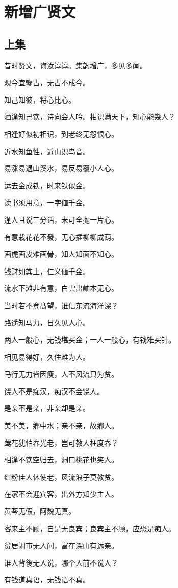 \documentclass[12pt,oneside]{book}
\begin{document}
\chapter{新增广贤文}
\section{上集}
昔时贤文，诲汝谆谆。集韵增广，多见多闻。

观今宜鑒古，无古不成今。

知己知彼，将心比心。

酒逢知己饮，诗向会人吟。相识满天下，知心能幾人？

相逢好似初相识，到老终无怨恨心。

近水知鱼性，近山识鸟音。

易涨易退山溪水，易反易覆小人心。

运去金成铁，时来铁似金。

读书须用意，一字値千金。

逢人且说三分话，未可全抛一片心。

有意栽花花不發，无心插柳柳成荫。

画虎画皮难画骨，知人知面不知心。

钱财如粪土，仁义値千金。

流水下滩非有意，白雲出岫本无心。

当时若不登髙望，谁信东流海洋深？

路遥知马力，日久见人心。

两人一般心，无钱堪买金；一人一般心，有钱难买针。

相见易得好，久住难为人。

马行无力皆因瘦，人不风流只为贫。

饶人不是痴汉，痴汉不会饶人。

是亲不是亲，非亲却是亲。

美不美，鄕中水；亲不亲，故鄕人。

莺花犹怕春光老，岂可教人枉度春？

相逢不饮空归去，洞口桃花也笑人。

红粉佳人休使老，风流浪子莫教贫。

在家不会迎宾客，出外方知少主人。

黄芩无假，阿魏无真。

客来主不顾，自是无良宾；良宾主不顾，应恐是痴人。

贫居闹市无人问，富在深山有远亲。

谁人背後无人说，哪个人前不说人？

有钱道真语，无钱语不真。
\end{document}
